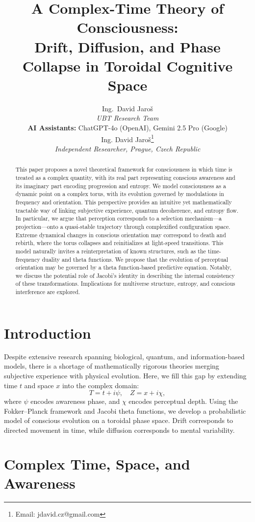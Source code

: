 \documentclass[12pt]{article}
\title{A Complex-Time Theory of Consciousness:\\ Drift, Diffusion, and Phase Collapse in Toroidal Cognitive Space}
\author{
Ing.~David Jaroš \\
\textit{UBT Research Team} \\
\textbf{AI Assistants:} ChatGPT-4o (OpenAI), Gemini 2.5 Pro (Google) \\
Ing. David Jaroš\thanks{Email: jdavid.cz@gmail.com} \\
\textit{Independent Researcher, Prague, Czech Republic}}
\date{}
\begin{document}
\maketitle

\begin{abstract}
This paper proposes a novel theoretical framework for consciousness in which time is treated as a complex quantity, with its real part representing conscious awareness and its imaginary part encoding progression and entropy. We model consciousness as a dynamic point on a complex torus, with its evolution governed by modulations in frequency and orientation. This perspective provides an intuitive yet mathematically tractable way of linking subjective experience, quantum decoherence, and entropy flow. In particular, we argue that perception corresponds to a selection mechanism---a projection---onto a quasi-stable trajectory through complexified configuration space. Extreme dynamical changes in conscious orientation may correspond to death and rebirth, where the torus collapses and reinitializes at light-speed transitions. This model naturally invites a reinterpretation of known structures, such as the time-frequency duality and theta functions. We propose that the evolution of perceptual orientation may be governed by a theta function-based predictive equation. Notably, we discuss the potential role of Jacobi's identity in describing the internal consistency of these transformations. Implications for multiverse structure, entropy, and conscious interference are explored.
\end{abstract}

\section{Introduction}

Despite extensive research spanning biological, quantum, and information-based models, there is a shortage of mathematically rigorous theories merging subjective experience with physical evolution. Here, we fill this gap by extending time $t$ and space $x$ into the complex domain:
\[
T = t + i\psi, \quad Z = x + i\chi,
\]
where $\psi$ encodes awareness phase, and $\chi$ encodes perceptual depth. Using the Fokker--Planck framework and Jacobi theta functions, we develop a probabilistic model of conscious evolution on a toroidal phase space. Drift corresponds to directed movement in time, while diffusion corresponds to mental variability.

\section{Complex Time, Space, and Awareness}
\end{document}
